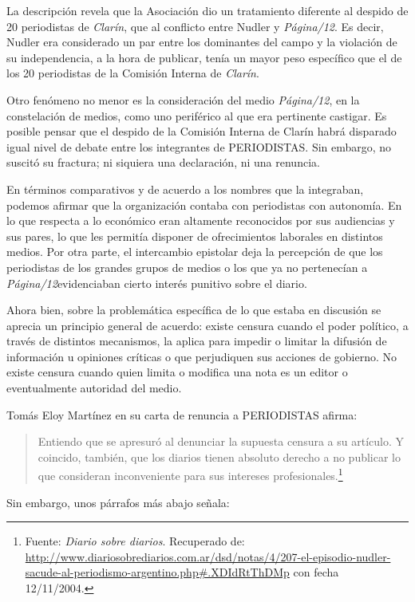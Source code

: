 {La descripción revela que la Asociación dio un tratamiento diferente al despido de 20 periodistas de \emph{Clarín}, que al conflicto entre Nudler y \emph{Página/12}. Es decir, Nudler era considerado un par entre los dominantes del campo y la violación de su independencia, a la hora de publicar, tenía un mayor peso específico que el de los 20 periodistas de la Comisión Interna de \emph{Clarín}.

Otro fenómeno no menor es la consideración del medio \emph{Página/12}, en la constelación de medios, como uno periférico al que era pertinente castigar. Es posible pensar que el despido de la Comisión Interna de Clarín habrá disparado igual nivel de debate entre los integrantes de PERIODISTAS. Sin embargo, no suscitó su fractura; ni siquiera una declaración, ni una renuncia.

En términos comparativos y de acuerdo a los nombres que la integraban, podemos afirmar que la organización contaba con periodistas con autonomía. En lo que respecta a lo económico eran altamente reconocidos por sus audiencias y sus pares, lo que les permitía disponer de ofrecimientos laborales en distintos medios. Por otra parte, el intercambio epistolar deja la percepción de que los periodistas de los grandes grupos de medios o los que ya no pertenecían a \emph{Página/12}evidenciaban cierto interés punitivo sobre el diario.

Ahora bien, sobre la problemática específica de lo que estaba en discusión se aprecia un principio general de acuerdo: existe censura cuando el poder político, a través de distintos mecanismos, la aplica para impedir o limitar la difusión de información u opiniones críticas o que perjudiquen sus acciones de gobierno. No existe censura cuando quien limita o modifica una nota es un editor o eventualmente autoridad del medio.

Tomás Eloy Martínez en su carta de renuncia a PERIODISTAS afirma:

\begin{quote}
Entiendo que se apresuró al denunciar la supuesta censura a su artículo. Y coincido, también, que los diarios tienen absoluto derecho a no publicar lo que consideran inconveniente para sus intereses profesionales.\footnote{Fuente: \emph{Diario sobre diarios}. Recuperado de: \url{http://www.diariosobrediarios.com.ar/dsd/notas/4/207-el-episodio-nudler-sacude-al-periodismo-argentino.php\#.XDIdRtThDMp} con fecha 12/11/2004.}
\end{quote}

Sin embargo, unos párrafos más abajo señala:

}
